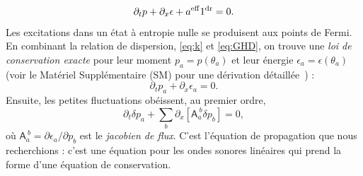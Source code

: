\documentclass[twocolumn,amsfonts,showpacs,superscriptaddress]{revtex4-1}
\begin{document}
{\begin{equation*}%
	\partial_t p + \partial_x \epsilon + a^{\rm eff} 1^{\rm dr} = 0.
\end{equation*}
Les excitations dans un état à entropie nulle se produisent aux points de Fermi. En combinant la relation de dispersion, \eqref{eq:k} et \eqref{eq:GHD}, on trouve une {\em loi de conservation exacte} pour leur moment $p_a = p(\theta_a)$ et leur énergie $\epsilon_a = \epsilon(\theta_a)$ (voir le Matériel Supplémentaire (SM) pour une dérivation détaillée~\cite{SM}) :
\begin{equation*}%
	\partial_t p_a + \partial_x \epsilon_a = 0.
\end{equation*}
Ensuite, les petites fluctuations obéissent, au premier ordre,
\begin{equation*}%
	\partial_t \delta p_a + \sum_b \partial_x[\mathsf A_a^{~b} \delta p_b] = 0,
\end{equation*}
où $ \mathsf A_a^{~b} = \partial \epsilon_a / \partial p_b$ est le {\it jacobien de flux}. C'est l'équation de propagation que nous recherchions : c'est une équation pour les ondes sonores linéaires qui prend la forme d'une équation de conservation.}
\end{document}
